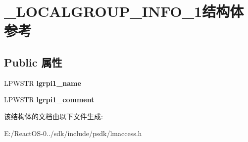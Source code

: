 \hypertarget{struct___l_o_c_a_l_g_r_o_u_p___i_n_f_o__1}{}\section{\+\_\+\+L\+O\+C\+A\+L\+G\+R\+O\+U\+P\+\_\+\+I\+N\+F\+O\+\_\+1结构体 参考}
\label{struct___l_o_c_a_l_g_r_o_u_p___i_n_f_o__1}
\subsection*{Public 属性}
\begin{DoxyCompactItemize}
\item 
\mbox{\label{struct___l_o_c_a_l_g_r_o_u_p___i_n_f_o__1_ae9ed1ced38d5e20e3ac07c91158ee344}} 
L\+P\+W\+S\+TR {\bfseries lgrpi1\+\_\+name}
\item 
\mbox{\label{struct___l_o_c_a_l_g_r_o_u_p___i_n_f_o__1_a3796e2edabeb889e226baa6bdf522455}} 
L\+P\+W\+S\+TR {\bfseries lgrpi1\+\_\+comment}
\end{DoxyCompactItemize}


该结构体的文档由以下文件生成\+:\begin{DoxyCompactItemize}
\item 
E\+:/\+React\+O\+S-\/0../sdk/include/psdk/lmaccess.\+h\end{DoxyCompactItemize}
